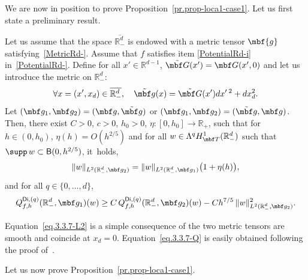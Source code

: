 We are now in
position to prove Proposition~\ref{pr.prop-loca1-case1}.
Let us first state a preliminary result.
\begin{lemma}\label{le-3.3.7}
Let us assume that the space $\overline{\mathbb R^d_-}$ is endowed with a metric tensor $ \mbf{g}$ satisfying~\ref{MetricRd-}. Assume that $f$ satisfies item \eqref{PotentialRd-i} in~\ref{PotentialRd-}.
Define for all $x'\in \mathbb R^{d-1}$, $ \tilde{\mbf G}(x')= {\mbf
G}(x',0)$ and let us introduce the metric on $\mathbb R^d_-$:
\begin{equation}\label{eq.m-tilde}
\forall x=(x',x_d)\in \overline{\mathbb R^d_-}, \quad \tilde{\mbf g}(x)= \tilde{\mbf G}(x')dx'\,^2+dx_d^2.
\end{equation}
Let $ (\mbf g_1,\mbf g_2)=(\mbf g, \tilde{\mbf g})$ or $ (\mbf g_1,\mbf g_2)=(\tilde{\mbf g}, \mbf g)$.
Then, there exist $C>0$, $c>0$, $h_0>0$, $\eta:[0,h_0]\to\mathbb
R_+$, such that for $h\in (0,h_0)$, $\eta(h)=O(h^{2/5 })$ and for all $w\in \Lambda^q H^1_{\mbf T}(\mathbb R^d_-)$ such that $\supp\, w\subset \mathsf B(0,h^{2/5})$, it~holds,
\begin{equation}\label{eq.3.3.7-L2}
\Vert w \Vert_{L^2(\mathbb R^d_-, \mbf g_2)} = \Vert w \Vert_{L^2(\mathbb R^d_-, \mbf g_1)} \bigl(1+\eta(h)\bigr),
\end{equation}
and for all $q \in \{0, \ldots, d\}$,
\begin{equation}\label{eq.3.3.7-Q}
Q_{f,h}^{\mathsf{Di},(q)}(\mathbb R^d_-, \mbf g_1)(w)\ge C\, Q_{f,h}^{\mathsf{Di},(q)}(\mathbb R^d_-, \mbf g_2)(w)- Ch^{ 7/5}\, \Vert w \Vert_{L^2(\mathbb R^d_-, \mbf g_2)}^2.
\end{equation}
\end{lemma}
Equation~\eqref{eq.3.3.7-L2} is a simple consequence of the two metric
tensors are smooth and coincide at
$x_d=0$. Equation~\eqref{eq.3.3.7-Q} is easily obtained following the
proof of~\cite[Lem.\,3.3.7]{helffer-nier-06}.

Let us now prove Proposition~\ref{pr.prop-loca1-case1}.

